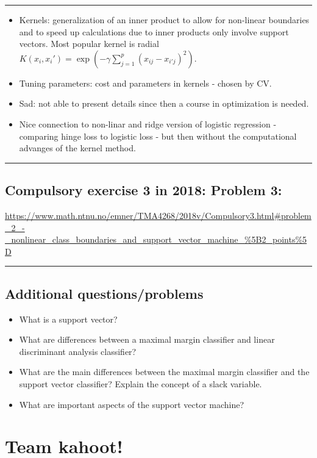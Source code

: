 \documentclass[]{article}
\providecommand{\tightlist}{%
  \setlength{\itemsep}{0pt}\setlength{\parskip}{0pt}}
\begin{document}
\begin{center}\rule{0.5\linewidth}{\linethickness}\end{center}

\begin{itemize}
\tightlist
\item
  Kernels: generalization of an inner product to allow for non-linear
  boundaries and to speed up calculations due to inner products only
  involve support vectors. Most popular kernel is radial
  \(K(x_i,x_i')=\exp(-\gamma\sum_{j=1}^p (x_{ij}-x_{i'j})^2)\).
\item
  Tuning parameters: cost and parameters in kernels - chosen by CV.
\item
  Sad: not able to present details since then a course in optimization
  is needed.
\item
  Nice connection to non-linar and ridge version of logistic regression
  - comparing hinge loss to logistic loss - but then without the
  computational advanges of the kernel method.
\end{itemize}

\begin{center}\rule{0.5\linewidth}{\linethickness}\end{center}

\subsection{Compulsory exercise 3 in 2018: Problem
3:}\label{compulsory-exercise-3-in-2018-problem-3}

\url{https://www.math.ntnu.no/emner/TMA4268/2018v/Compulsory3.html\#problem_2_-_nonlinear_class_boundaries_and_support_vector_machine_\%5B2_points\%5D}

\begin{center}\rule{0.5\linewidth}{\linethickness}\end{center}

\subsection{Additional
questions/problems}\label{additional-questionsproblems}

\begin{itemize}
\tightlist
\item
  What is a support vector?
\item
  What are differences between a maximal margin classifier and linear
  discriminant analysis classifier?
\item
  What are the main differences between the maximal margin classifier
  and the support vector classifier? Explain the concept of a slack
  variable.
\item
  What are important aspects of the support vector machine?
\end{itemize}

\section{Team kahoot!}\label{team-kahoot}
\end{document}
